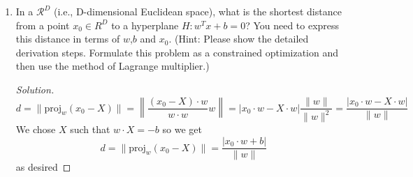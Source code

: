 \documentclass{article}
\newenvironment{solution}
  {\renewcommand\qedsymbol{$\blacksquare$}\begin{proof}[Solution]}
  {\end{proof}}
\begin{document}
\begin{enumerate}
\begin{solution}
\end{solution}
\bigskip
\item In a $\mathcal{R}^D$ (i.e., D-dimensional Euclidean space), what is the shortest distance from a point $x_0\in R^D$ to a hyperplane $H:w^Tx+b=0$? 
You need to express this distance in terms of $w$,$b$ and $x_0$. (Hint: Please show the detailed derivation steps. Formulate this problem as a constrained optimization and then use the method of Lagrange multiplier.)
\begin{solution}
    \[
        d=\| \text{proj}_{w} (x_0-X)\| = \left\| \frac{(x_0-X)\cdot w}{w \cdot w} w \right\| = |x_0 \cdot w - X \cdot w|\frac{\|w\|}{\|w\|^2} = \frac{|x_0 \cdot w - X \cdot w|}{\|w\|}
    \]
We chose $X$ such that $w\cdot X=-b$ so we get
\[ d=\| \text{proj}_{w} (x_0-X)\| = \frac{|x_0 \cdot w +b|}{\|w\|} \]
as desired

\end{solution}

\end{enumerate}
\end{document}
